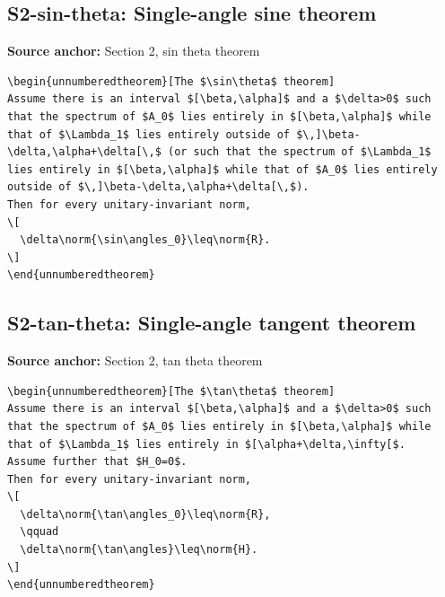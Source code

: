 \subsection*{S2-sin-theta: Single-angle sine theorem}
\noindent\textbf{Source anchor:} Section 2, sin theta theorem\\
\begin{verbatim}
\begin{unnumberedtheorem}[The $\sin\theta$ theorem]
Assume there is an interval $[\beta,\alpha]$ and a $\delta>0$ such that the spectrum of $A_0$ lies entirely in $[\beta,\alpha]$ while that of $\Lambda_1$ lies entirely outside of $\,]\beta-\delta,\alpha+\delta[\,$ (or such that the spectrum of $\Lambda_1$ lies entirely in $[\beta,\alpha]$ while that of $A_0$ lies entirely outside of $\,]\beta-\delta,\alpha+\delta[\,$).
Then for every unitary-invariant norm,
\[
  \delta\norm{\sin\angles_0}\leq\norm{R}.
\]
\end{unnumberedtheorem}
\end{verbatim}

\subsection*{S2-tan-theta: Single-angle tangent theorem}
\noindent\textbf{Source anchor:} Section 2, tan theta theorem\\
\begin{verbatim}
\begin{unnumberedtheorem}[The $\tan\theta$ theorem]
Assume there is an interval $[\beta,\alpha]$ and a $\delta>0$ such that the spectrum of $A_0$ lies entirely in $[\beta,\alpha]$ while that of $\Lambda_1$ lies entirely in $[\alpha+\delta,\infty[$.
Assume further that $H_0=0$.
Then for every unitary-invariant norm,
\[
  \delta\norm{\tan\angles_0}\leq\norm{R},
  \qquad
  \delta\norm{\tan\angles}\leq\norm{H}.
\]
\end{unnumberedtheorem}
\end{verbatim}

